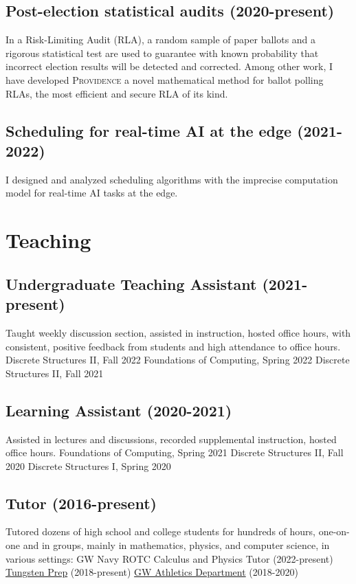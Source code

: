 \documentclass[letterpaper]{article}
\newcommand{\Providence}{\textsc{Providence}\xspace}
\begin{document}
\subsection*{Post-election statistical audits (2020-present)}
In a Risk-Limiting Audit (RLA), a random sample of paper ballots and a rigorous statistical test are used to guarantee with known probability that incorrect election results will be detected and corrected.
Among other work, I have developed \Providence a novel mathematical method for ballot polling RLAs, the most efficient and secure RLA of its kind.

\subsection*{Scheduling for real-time AI at the edge (2021-2022)}
I designed and analyzed scheduling algorithms with the imprecise computation model for real-time AI tasks at the edge. 

\section*{Teaching}
\subsection*{Undergraduate Teaching Assistant (2021-present)}
Taught weekly discussion section, assisted in instruction, hosted office hours, with consistent, positive feedback from students and high attendance to office hours.
\subitem
Discrete Structures II, Fall 2022
\subitem
Foundations of Computing, Spring 2022
\subitem
Discrete Structures II, Fall 2021
\subsection*{Learning Assistant (2020-2021)}
Assisted in lectures and discussions, recorded supplemental instruction, hosted office hours.
\subitem
Foundations of Computing, Spring 2021
\subitem
Discrete Structures II, Fall 2020
\subitem
Discrete Structures I, Spring 2020
\subsection*{Tutor (2016-present)}
Tutored dozens of high school and college students for hundreds of hours, one-on-one and in groups, mainly in mathematics, physics, and computer science, in various settings:
\subitem 
GW Navy ROTC Calculus and Physics Tutor (2022-present)
\subitem
\href{https://www.tungstenprep.com/}{Tungsten Prep} (2018-present) 
\subitem
\href{https://gwsports.com/sports/2018/7/23/school-bio-academic-support-tutor-info-html.aspx}{GW Athletics Department} (2018-2020) 
\end{document}
